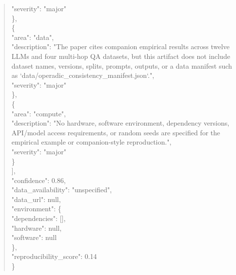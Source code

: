 \documentclass[11pt]{article}
\begin{document}
\begin{quote}
      "severity": "major"\\
    \},\\
    \{\\
      "area": "data",\\
      "description": "The paper cites companion empirical results across twelve LLMs and four multi-hop QA datasets, but this artifact does not include dataset names, versions, splits, prompts, outputs, or a data manifest such as `data/operadic\_consistency\_manifest.json`.",\\
      "severity": "major"\\
    \},\\
    \{\\
      "area": "compute",\\
      "description": "No hardware, software environment, dependency versions, API/model access requirements, or random seeds are specified for the empirical example or companion-style reproduction.",\\
      "severity": "major"\\
    \}\\
  ],\\
  "confidence": 0.86,\\
  "data\_availability": "unspecified",\\
  "data\_url": null,\\
  "environment": \{\\
    "dependencies": [],\\
    "hardware": null,\\
    "software": null\\
  \},\\
  "reproducibility\_score": 0.14\\
\}\\
\end{quote}
\end{document}
